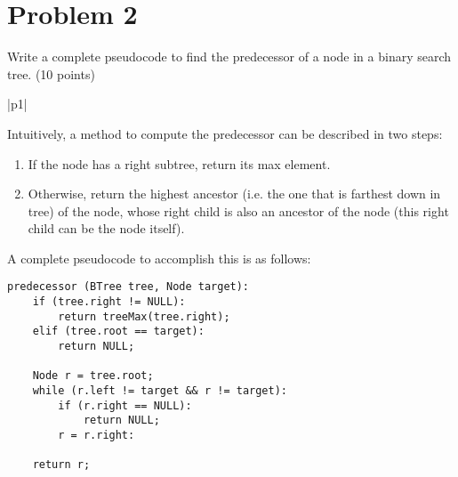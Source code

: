 \documentclass[10pt]{article}
\newenvironment{answer}
    {\begin{center}
    \begin{tabular}{|p{1\textwidth}|}
    \hline
    }
    { 
    \\\hline
    \end{tabular} 
    \end{center}
    }
\begin{document}
\newpage

\section*{Problem 2}
Write a complete pseudocode to find the predecessor of a node in a binary search tree. (10 points)
\begin{answer}
  Intuitively, a method to compute the predecessor can be described in two steps:
  \begin{enumerate}
  \item If the node has a right subtree, return its max element.
  \item Otherwise, return the highest ancestor (i.e. the one that is farthest down in tree) of the node, whose right child is also an ancestor of the node (this right child can be the node itself).
  \end{enumerate}
  A complete pseudocode to accomplish this is as follows: \\
\begin{verbatim}
predecessor (BTree tree, Node target):
    if (tree.right != NULL):
        return treeMax(tree.right);
    elif (tree.root == target):
        return NULL;
    
    Node r = tree.root;
    while (r.left != target && r != target):
        if (r.right == NULL):
            return NULL;
        r = r.right:
   
    return r;
\end{verbatim}

\end{answer}
\end{document}
